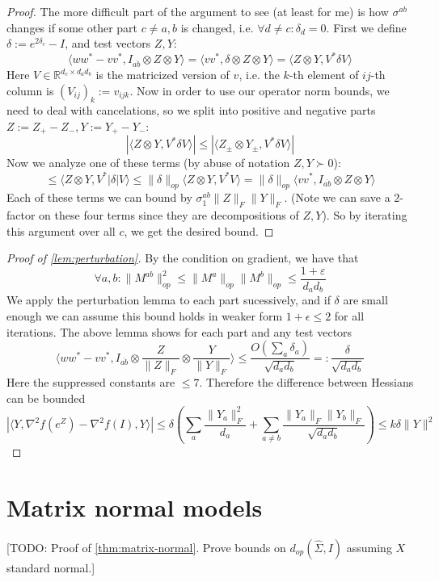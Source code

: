 \documentclass{article}
\newcommand{\R}{{\mathbb{R}}}
\newcommand\eps{\varepsilon}
\newcommand{\TODO}[1]{{\color{blue}[TODO: #1]}}
\begin{document}
\begin{proof}
The more difficult part of the argument to see (at least for me) is how $\sigma^{ab}$ changes if some other part $c \neq a,b$ is changed, i.e. $\forall d \neq c: \delta_{d} = 0$. First we define $\delta := e^{2 \delta_{c}} - I$, and test vectors $Z,Y$:
\[ \langle w w^{*} - v v^{*}, I_{\overline{ab}} \otimes Z \otimes Y \rangle = \langle v v^{*}, \delta \otimes Z \otimes Y \rangle  = \langle Z \otimes Y, V^{*} \delta V \rangle \]
Here $V \in \R^{d_{c} \times d_{a}d_{b}}$ is the matricized version of $v$, i.e. the $k$-th element of $ij$-th column is $(V_{ij})_{k} := v_{ijk}$. Now in order to use our operator norm bounds, we need to deal with cancelations, so we split into positive and negative parts $Z := Z_{+} - Z_{-}, Y := Y_{+} - Y_{-}$:
\[ |\langle Z \otimes Y, V^{*} \delta V \rangle| \leq |\langle Z_{\pm} \otimes Y_{\pm}, V^{*} \delta V \rangle |  \]
Now we analyze one of these terms (by abuse of notation $Z, Y \succ 0$):
\[ \leq \langle Z \otimes Y, V^{*} |\delta| V \rangle \leq \|\delta\|_{op} \langle Z \otimes Y, V^{*} V \rangle = \|\delta\|_{op} \langle v v^{*}, I_{\overline{ab}} \otimes Z \otimes Y \rangle   \]
Each of these terms we can bound by $\sigma^{ab}_{1} \|Z\|_{F} \|Y\|_{F}$. (Note we can save a $2$-factor on these four terms since they are decompositions of $Z,Y$). So by iterating this argument over all $c$, we get the desired bound. 
\end{proof}


\begin{proof}[Proof of \cref{lem:perturbation}]
By the condition on gradient, we have that 
\[ \forall a,b: \|M^{ab}\|_{op}^{2} \leq \|M^{a}\|_{op} \|M^{b}\|_{op} \leq \frac{1+\eps}{d_{a} d_{b}}   \]
We apply the perturbation lemma to each part sucessively, and if $\delta$ are small enough we can assume this bound holds in weaker form $1+\epsilon \leq 2$ for all iterations. The above lemma shows for each part and any test vectors 
\[ \langle w w^{*} - v v^{*}, I_{\overline{ab}} \otimes \frac{Z}{\|Z\|_{F}} \otimes \frac{Y}{\|Y\|_{F}} \rangle \leq \frac{O( \sum_{a} \delta_{a} )}{\sqrt{d_{a} d_{b}}} =: \frac{\delta}{\sqrt{d_{a} d_{b}}}   \]
Here the suppressed constants are $\leq 7$. Therefore the difference between Hessians can be bounded
\[ |\langle Y, \nabla^{2} f(e^{Z}) - \nabla^{2} f(I), Y \rangle|  \leq \delta \left( \sum_{a} \frac{\|Y_{a}\|_{F}^{2}}{d_{a}} + \sum_{a \neq b} \frac{\|Y_{a}\|_{F} \|Y_{b}\|_{F}}{\sqrt{d_{a} d_{b}}} \right) \leq k \delta \|Y\|^{2}   \]
\end{proof}


\section{Matrix normal models}\label{sec:matrix-normal}
\TODO{Proof of \cref{thm:matrix-normal}. Prove bounds on $d_{op}(\hat{\Sigma}, I)$ assuming $X$ standard normal.}
\end{document}
